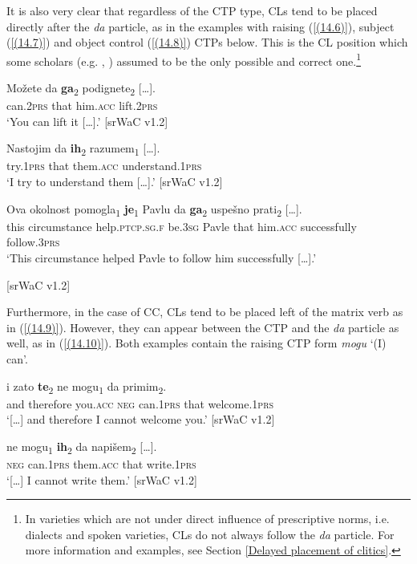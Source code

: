 \noindent It is also very clear that regardless of the CTP type, CLs tend to be placed directly after the \textit{da} particle, as in the examples with raising (\ref{(14.6)}), subject (\ref{(14.7)}) and object control (\ref{(14.8)}) CTPs below. This is the CL position which some scholars (e.g. \citealt[41]{Browne03}, \citealt[41]{CavarWilder94}) assumed to be the only possible and correct one.\footnote{In varieties which are not under direct influence of prescriptive norms, i.e. dialects and spoken varieties, CLs do not always follow the \textit{da} particle. For more information and examples, see Section \ref{Delayed placement of clitics}.}

\begin{exe}\ex\label{(14.6)}
\gll Možete da \textbf{ga}\textsubscript{2} {podignete\textsubscript{2} [\dots].}\\
can.\textsc{2prs} that him.\textsc{acc} lift.\textsc{2prs}\\
\glt  ‘You can lift it [\dots].’
\hfill [srWaC v1.2]

\ex\label{(14.7)}
\gll Nastojim da	\textbf{ih}\textsubscript{2}	{razumem\textsubscript{1}	[\dots].}\\
try.\textsc{1prs} that them.\textsc{acc} understand.\textsc{1prs}\\
\glt  ‘I try to understand them [\dots].’
\hfill [srWaC v1.2]

\ex\label{(14.8)}
\gll Ova okolnost pomogla\textsubscript{1} \textbf{je}\textsubscript{1} Pavlu da \textbf{ga}\textsubscript{2} uspešno {prati\textsubscript{2} [\dots].}\\
this circumstance help.\textsc{ptcp.sg.f} be.\textsc{3sg} Pavle that him.\textsc{acc} successfully follow.\textsc{3prs}\\
\glt ‘This circumstance helped Pavle to follow him successfully [\dots].’ \\
\strut\hfill [srWaC v1.2]
\end{exe}

\noindent Furthermore, in the case of CC, CLs tend to be placed left of the matrix verb as in (\ref{(14.9)}). However, they can appear between the CTP and the \textit{da} particle as well, as in (\ref{(14.10)}). Both examples contain the raising CTP form \textit{mogu} ‘(I) can’.

\begin{exe}\ex\label{(14.9)}
\gll [\dots] i zato \textbf{te}\textsubscript{2} ne mogu\textsubscript{1} da primim\textsubscript{2}.\\
{} and therefore you.\textsc{acc} \textsc{neg} can.\textsc{1prs} that welcome.\textsc{1prs} \\
\glt ‘[\dots] and therefore I cannot welcome you.’
\hfill [srWaC v1.2]

\ex\label{(14.10)}
\gll [\dots] ne mogu\textsubscript{1} \textbf{ih}\textsubscript{2} da {napišem\textsubscript{2} [\dots].}\\
{} \textsc{neg} can.\textsc{1prs} them.\textsc{acc} that write.\textsc{1prs} \\
\glt ‘[\dots] I cannot write them.’
\hfill [srWaC v1.2]
\end{exe}

